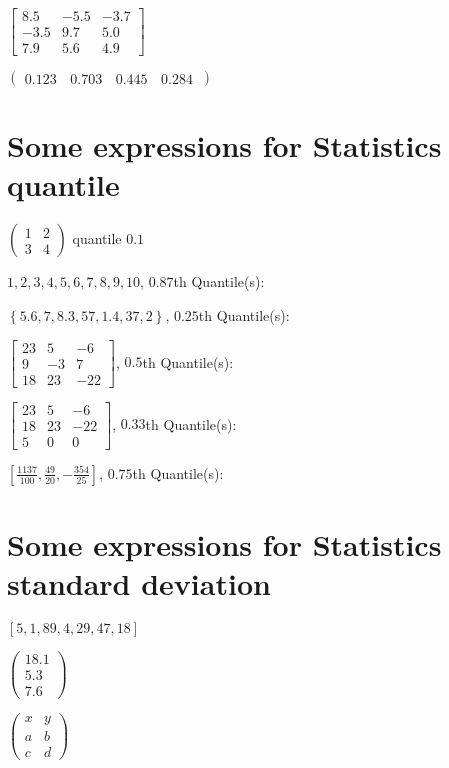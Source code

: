 \documentclass{article}
\begin{document}
$\left[ 
\begin{array}{rrr}
8.5 & -5.5 & -3.7 \\ 
-3.5 & 9.7 & 5.0 \\ 
7.9 & 5.6 & 4.9%
\end{array}%
\right] $

$\left( 
\begin{array}{cccc}
0.123\, & 0.703\, & 0.445\, & 0.284\,%
\end{array}%
\right) $

\section{Some expressions for Statistics quantile}

$\left( 
\begin{array}{cc}
1 & 2 \\ 
3 & 4%
\end{array}%
\right) $ quantile $0.1$

$1,2,3,4,5,6,7,8,9,10$, $0.87$th Quantile(s):

$\left\{ 5.6,7,8.3,57,1.4,37,2\right\} $, $0.25$th Quantile(s):

$\left[ 
\begin{array}{ccc}
23 & 5 & -6 \\ 
9 & -3 & 7 \\ 
18 & 23 & -22%
\end{array}%
\right] $, $0.5$th Quantile(s):

$\left[ 
\begin{array}{ccc}
23 & 5 & -6 \\ 
18 & 23 & -22 \\ 
5 & 0 & 0%
\end{array}%
\right] $, $0.33$th Quantile(s):

$\left[ \frac{1137}{100},\frac{49}{20},-\frac{354}{25}\right] $, $0.75$th
Quantile(s):

\section{Some expressions for Statistics standard deviation}

$\left[ 5,1,89,4,29,47,18\right] $

$\left( 
\begin{array}{r}
18.1 \\ 
5.3 \\ 
7.6%
\end{array}%
\right) $

$\left( 
\begin{array}{cc}
x & y \\ 
a & b \\ 
c & d%
\end{array}%
\right) $
\end{document}

